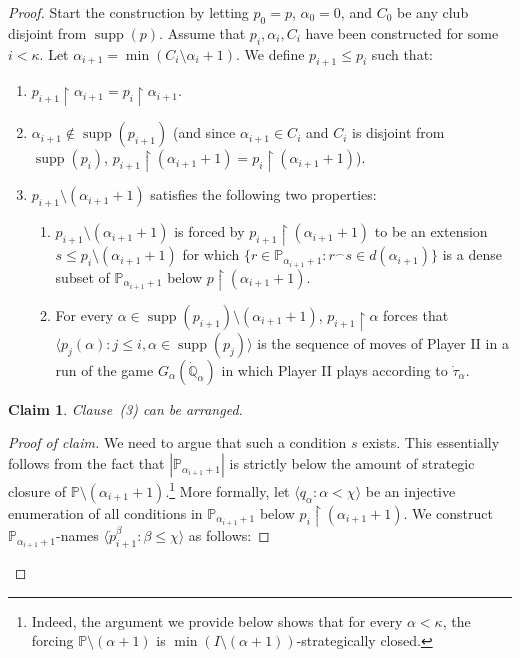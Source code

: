\documentclass[10pt,a4paper]{amsart}
\newtheorem{claim}{Claim}
\newcommand{\la}{\langle}
\newcommand{\po}{\mathbb{P}}
\newcommand{\qo}{\mathbb{Q}}
\newcommand{\ra}{\rangle}
\renewcommand{\restriction}{\mathbin\upharpoonright}    %
\DeclareMathOperator{\supp}{supp}
\begin{document}
\begin{proof}
    Start the construction by letting $p_0 = p$, $\alpha_0 = 0$, and $C_0$ be any club disjoint from $\supp(p)$. Assume that $p_i, \alpha_i, C_i$ have been constructed for some $i<\kappa$. Let $\alpha_{i+1} = \min(C_i \setminus \alpha_i+1)$. We define $p_{i+1}\leq p_i$ such that:
    \begin{enumerate}
        \item $p_{i+1}\restriction \alpha_{i+1} = p_i \restriction \alpha_{i+1}$.
        \item $\alpha_{i+1}\notin \supp(p_{i+1})$ (and since $\alpha_{i+1}\in C_i$ and $C_i$ is disjoint from $\supp(p_i)$,  $p_{i+1}\restriction (\alpha_{i+1}+1) = p_{i}\restriction (\alpha_{i+1}+1)$).
        \item $p_{i+1}\setminus (\alpha_{i+1}+1)$ satisfies the following two properties:
        \begin{enumerate}
            \item $p_{i+1}\setminus (\alpha_{i+1}+1)$ is forced by $p_{i+1}\restriction (\alpha_{i+1}+1)$ to be an  extension $s\leq p_i\setminus (\alpha_{i+1}+1)$ for which $\{ r\in \po_{\alpha_{i+1}+1} \colon  r^{\frown} s\in d(\alpha_{i+1}) \}$ is a dense subset of $\po_{\alpha_{i+1}+1}$ below $p\restriction (\alpha_{i+1}+1)$.
            \item For every $\alpha\in \supp(p_{i+1})\setminus (\alpha_{i+1}+1)$, $p_{i+1}\restriction \alpha$ forces that $\la p_j(\alpha) \colon j\leq i, \alpha\in \supp(p_j) \ra$ is the sequence of moves of Player II in a run of the game $G_\alpha(\dot{\qo}_\alpha)$ in which Player II plays according to $\dot{\tau}_\alpha$.
        \end{enumerate}
    \end{enumerate}
\begin{claim}\label{Claim: fusion lemma, arranging clause 3}
    Clause~(3) can be arranged.
\end{claim}
\begin{proof}[Proof of claim]
   We need to argue that such a condition $s$ exists.  This essentially follows from the fact that $|\po_{\alpha_{i+1}+1}|$ is strictly below the amount of strategic closure of $\po\setminus (\alpha_{i+1}+1)$.\footnote{Indeed, the argument we provide below shows that for every $\alpha<\kappa$, the forcing $\po\setminus (\alpha+1)$ is $ \min(I\setminus (\alpha+1))$-strategically closed.} More formally, let $\langle q_\alpha\colon \alpha<\chi\rangle$ be an injective enumeration of all conditions in $\mathbb{P}_{\alpha_{i+1}+1}$ below $p_i\restriction (\alpha_{i+1}+1)$. We construct $\mathbb{P}_{\alpha_{i+1}+1}$-names $\langle \dot{p}_{i+1}^\beta\colon \beta\leq \chi\rangle$ as follows:

\end{proof}
\end{proof}
\end{document}
